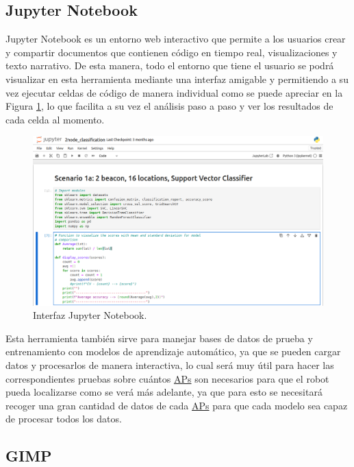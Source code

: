 \subsection{Jupyter Notebook}
\label{subsec:Jupyter}

Jupyter Notebook es un entorno web interactivo que permite a los usuarios crear y compartir documentos que contienen código en tiempo real, visualizaciones y texto narrativo. De esta manera, todo el entorno que tiene el usuario se podrá visualizar en esta herramienta mediante una interfaz amigable y permitiendo a su vez ejecutar celdas de código de manera individual como se puede apreciar en la Figura \ref{fig:jup1}, lo que facilita a su vez el análisis paso a paso y ver los resultados de cada celda al momento.\\

\begin{figure}[H]
  \centering
  \includegraphics[scale=0.35]{figs/pepe} %
  \caption{Interfaz Jupyter Notebook.}
  \label{fig:jup1}
\end{figure}

Esta herramienta también sirve para manejar bases de datos de prueba y entrenamiento con modelos de aprendizaje automático, ya que se pueden cargar datos y procesarlos de manera interactiva, lo cual será muy útil para hacer las correspondientes pruebas sobre cuántos \hyperlink{APs}{APs} son necesarios para que el robot pueda localizarse como se verá más adelante, ya que para esto se necesitará recoger una gran cantidad de datos de cada \hyperlink{APs}{APs} para que cada modelo sea capaz de procesar todos los datos.


\subsection{GIMP}
\label{subsec:gimp}

